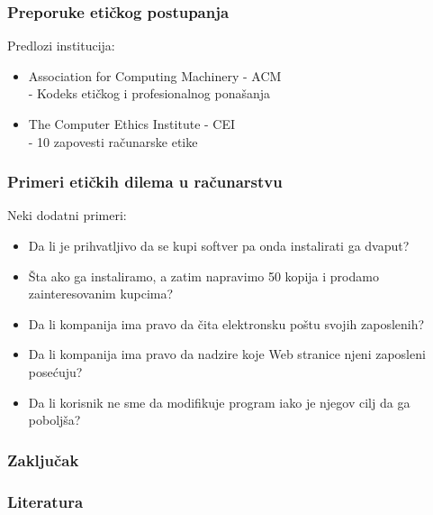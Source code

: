 \documentclass[pdf]{beamer}
\begin{document}
\begin{frame}
\frametitle{Preporuke etičkog postupanja}

	Predlozi institucija:
	\begin{itemize}
		\item Association for Computing Machinery - ACM %
		\\- Kodeks etičkog i profesionalnog ponašanja %
		\item The Computer Ethics Institute - CEI %
		\\- 10 zapovesti računarske etike %
	\end{itemize}


\end{frame}


\begin{frame}
\frametitle{Primeri etičkih dilema u računarstvu}
	Neki dodatni primeri:
	\begin{itemize}
	\item Da li je prihvatljivo da se kupi softver pa onda instalirati ga dvaput?
	\item Šta ako ga instaliramo, a zatim napravimo 50 kopija i prodamo zainteresovanim kupcima?
	\item Da li kompanija ima pravo da čita elektronsku poštu svojih zaposlenih?
	\item Da li kompanija ima pravo da nadzire koje Web stranice njeni zaposleni posećuju?
	\item Da li korisnik ne sme da modifikuje program iako je njegov cilj da ga poboljša?
	\end{itemize}
\end{frame}

\begin{frame}
\frametitle{Zaključak}
	\end{frame}


\begin{frame}
\frametitle{Literatura}
	\end{frame}
\end{document}

